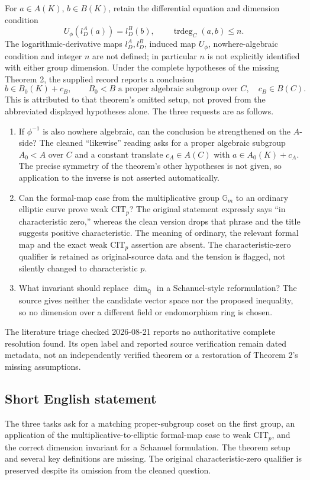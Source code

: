 \documentclass[11pt]{article}
\newcommand{\Q}{\mathbb{Q}}
\begin{document}
For \(a\in A(K)\), \(b\in B(K)\), retain the differential equation and dimension condition
\[
 U_\phi(l_D^A(a))=l_D^B(b),\qquad
 \operatorname{trdeg}_C(a,b)\leq n.
\]
The logarithmic-derivative maps \(l_D^A,l_D^B\), induced map \(U_\phi\), nowhere-algebraic condition and integer \(n\) are not defined; in particular \(n\) is not explicitly identified with either group dimension. Under the complete hypotheses of the missing Theorem 2, the supplied record reports a conclusion
\[
 b\in B_0(K)+c_B,
 \qquad B_0<B\text{ a proper algebraic subgroup over }C,
 \quad c_B\in B(C).
\]
This is attributed to that theorem's omitted setup, not proved from the abbreviated displayed hypotheses alone. The three requests are as follows.
\begin{enumerate}
\item If \(\phi^{-1}\) is also nowhere algebraic, can the conclusion be strengthened on the \(A\)-side? The cleaned ``likewise'' reading asks for a proper algebraic subgroup \(A_0<A\) over \(C\) and a constant translate \(c_A\in A(C)\) with \(a\in A_0(K)+c_A\). The precise symmetry of the theorem's other hypotheses is not given, so application to the inverse is not asserted automatically.
\item Can the formal-map case from the multiplicative group \(\mathbb G_m\) to an ordinary elliptic curve prove weak \(\mathrm{CIT}_p\)? The original statement expressly says ``in characteristic zero,'' whereas the clean version drops that phrase and the title suggests positive characteristic. The meaning of ordinary, the relevant formal map and the exact weak \(\mathrm{CIT}_p\) assertion are absent. The characteristic-zero qualifier is retained as original-source data and the tension is flagged, not silently changed to characteristic \(p\).
\item What invariant should replace \(\dim_\Q\) in a Schanuel-style reformulation? The source gives neither the candidate vector space nor the proposed inequality, so no dimension over a different field or endomorphism ring is chosen.
\end{enumerate}
The literature triage checked 2026-08-21 reports no authoritative complete resolution found. Its open label and reported source verification remain dated metadata, not an independently verified theorem or a restoration of Theorem 2's missing assumptions.
\subsection{Short English statement}
The three tasks ask for a matching proper-subgroup coset on the first group, an application of the multiplicative-to-elliptic formal-map case to weak \(\mathrm{CIT}_p\), and the correct dimension invariant for a Schanuel formulation. The theorem setup and several key definitions are missing. The original characteristic-zero qualifier is preserved despite its omission from the cleaned question.
\end{document}
